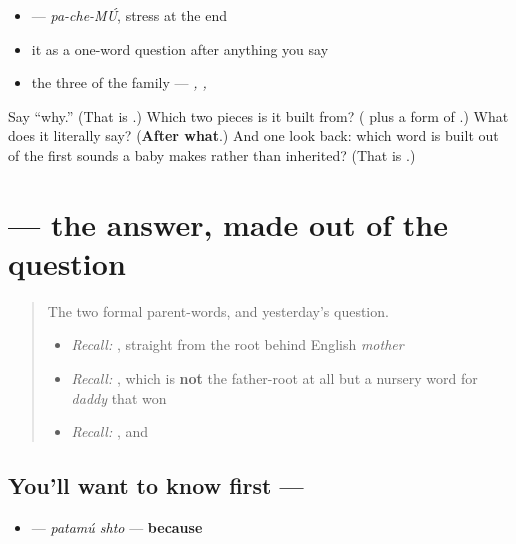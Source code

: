 \begin{itemize}
\raggedright
  \item \emph{} — \emph{pa-che-MÚ}, stress at the end
  \item it as a one-word question after anything you say
  \item the three of the family — \emph{, , }
\end{itemize}

\begin{tcolorbox}[breakable,colback=teal!4,colframe=teal!35!black,title={Before you move on}]
Say \textquotedblleft{}why.\textquotedblright{} (That is \textbf{}.) Which two pieces is it built from? (\textbf{} plus a form of \textbf{}.) What does it literally say? (\textbf{After what}.) And one look back: which word is built out of the first sounds a baby makes rather than inherited? (That is \textbf{}.)
\end{tcolorbox}
\section[\texorpdfstring{\ru{потому} \ru{что} (patamú shto)}{потому что (patamú shto)}]{  — the answer, made out of the question}

\label{lesson:RU-C19-potomu-chto}



\begin{quote}
The two formal parent-words, and yesterday's question.

\begin{itemize}
\raggedright
  \item \emph{Recall:} \emph{}, straight from the root behind English \emph{mother}
  \item \emph{Recall:} \emph{}, which is \textbf{not} the father-root at all but a nursery word for \emph{daddy} that won
  \item \emph{Recall:} \emph{}, and \emph{}
\end{itemize}
\end{quote}

\subsection*{You'll want to know first —  }
\begin{itemize}
\raggedright
  \item \textbf{ } — \emph{patamú shto} — \textbf{because}
\end{itemize}

